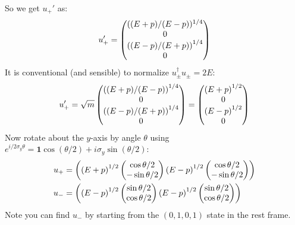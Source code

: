 So we get $u_+'$ as:
\begin{align*}
   u_+'={\pmqty{((E+p)/(E-p))^{1/4}\\0\\{((E-p)/(E+p))}^{1/4}\\0}}
\end{align*}
It is conventional (and sensible) to normalize $u_\pm^\dag u_\pm=2E$:
\begin{align*}
  u_+'=\sqrt{m}\pmqty{{((E+p)/(E-p))}^{1/4}\\0\\{((E-p)/(E+p))}^{1/4}\\0}
  =\pmqty{{(E+p)}^{1/2}\\0\\{(E-p)}^{1/2}\\0}
\end{align*}
Now rotate about the $y$-axis by angle $\theta$ using
$e^{i/2\sigma_y\theta}=\bm{1}\cos(\theta/2)+i\sigma_y\sin(\theta/2)$:
\begin{align*}
  u_{+}&=\pmqty{
    {(E+p)}^{1/2}\pmqty{\cos\theta/2\\-\sin\theta/2}
    {(E-p)}^{1/2}\pmqty{\cos\theta/2\\-\sin\theta/2}
  }\\
  u_{-}&=\pmqty{
    {(E-p)}^{1/2}\pmqty{\sin\theta/2\\\cos\theta/2}
    {(E-p)}^{1/2}\pmqty{\sin\theta/2\\\cos\theta/2}
  }
\end{align*}
Note you can find $u_-$ by starting from the $(0,1,0,1)$ state in the rest frame.

